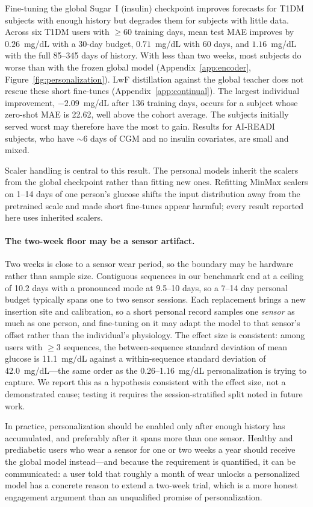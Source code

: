 \documentclass[11pt,a4paper]{article}
\begin{document}
Fine-tuning the global Sugar~I (insulin) checkpoint improves forecasts for T1DM subjects with enough history but degrades them for subjects with little data.
Across six T1DM users with $\geq$60 training days, mean test MAE improves by $0.26$~mg/dL with a 30-day budget, $0.71$~mg/dL with 60 days, and $1.16$~mg/dL with the full 85--345 days of history.
With less than two weeks, most subjects do worse than with the frozen global model (Appendix~\ref{app:encoder}, Figure~\ref{fig:personalization}).
LwF distillation against the global teacher does not rescue these short fine-tunes (Appendix~\ref{app:continual}).
The largest individual improvement, $-2.09$~mg/dL after 136 training days, occurs for a subject whose zero-shot MAE is 22.62, well above the cohort average.
The subjects initially served worst may therefore have the most to gain.
Results for AI-READI subjects, who have $\sim$6 days of CGM and no insulin covariates, are small and mixed.

Scaler handling is central to this result.
The personal models inherit the scalers from the global checkpoint rather than fitting new ones.
Refitting MinMax scalers on 1--14 days of one person's glucose shifts the input distribution away from the pretrained scale and made short fine-tunes appear harmful; every result reported here uses inherited scalers.
\paragraph{The two-week floor may be a sensor artifact.}
Two weeks is close to a sensor wear period, so the boundary may be hardware rather than sample size.
Contiguous sequences in our benchmark end at a ceiling of 10.2 days with a pronounced mode at 9.5--10 days, so a 7--14 day personal budget typically spans one to two sensor sessions.
Each replacement brings a new insertion site and calibration, so a short personal record samples one \emph{sensor} as much as one person, and fine-tuning on it may adapt the model to that sensor's offset rather than the individual's physiology.
The effect size is consistent: among users with $\geq$3 sequences, the between-sequence standard deviation of mean glucose is 11.1~mg/dL against a within-sequence standard deviation of 42.0~mg/dL---the same order as the 0.26--1.16~mg/dL personalization is trying to capture.
We report this as a hypothesis consistent with the effect size, not a demonstrated cause; testing it requires the session-stratified split noted in future work.

In practice, personalization should be enabled only after enough history has accumulated, and preferably after it spans more than one sensor.
Healthy and prediabetic users who wear a sensor for one or two weeks a year should receive the global model instead---and because the requirement is quantified, it can be communicated: a user told that roughly a month of wear unlocks a personalized model has a concrete reason to extend a two-week trial, which is a more honest engagement argument than an unqualified promise of personalization.
\end{document}
